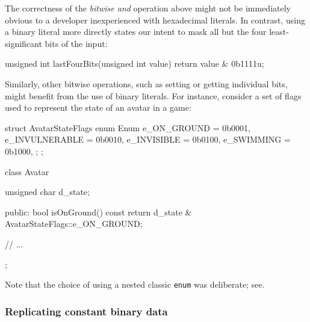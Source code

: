 \noindent The correctness of the \emph{bitwise and} operation above might not be
immediately obvious to a developer inexperienced with
hexadecimal literals. In contrast, using a binary literal more directly
states our intent to mask all but the four least-significant bits of the
input:

\begin{emcppslisting}
unsigned int lastFourBits(unsigned int value)
{
    return value & 0b1111u;
}
\end{emcppslisting}



Similarly, other bitwise operations, such as setting or getting
individual bits, might benefit from the use of binary literals. For
instance, consider a set of flags used to represent the state of an
avatar in a game:

%
%
%
\begin{emcppslisting}
struct AvatarStateFlags
{
    enum Enum
    {
        e_ON_GROUND    = 0b0001,
        e_INVULNERABLE = 0b0010,
        e_INVISIBLE    = 0b0100,
        e_SWIMMING     = 0b1000,
    };
};

class Avatar
{
    unsigned char d_state;

public:
    bool isOnGround() const
    {
        return d_state & AvatarStateFlags::e_ON_GROUND;
    }

    // ...
};
\end{emcppslisting}

\noindent Note that the choice of using a nested classic \lstinline!enum! was deliberate;
see\linebreak[4] .


\subsubsection[Replicating constant binary data]{Replicating constant binary data}\label{replicating-constant-binary-data}

